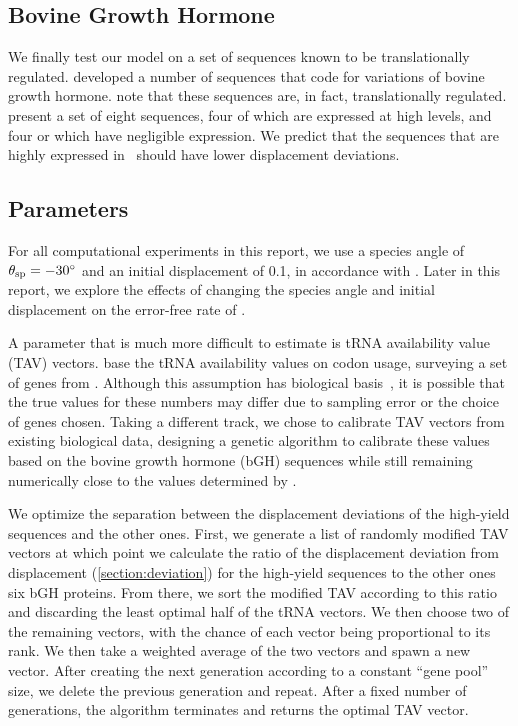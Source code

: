 \documentclass[12pt, draft]{article}
\numberwithin{equation}{section}
\begin{document}
\subsection{Bovine Growth Hormone}
We finally test our model on a set of sequences known to be translationally 
regulated.  \citet{schoner:bgh} developed a number of sequences that
code for variations of bovine growth hormone. \citeauthor{schoner:bgh}
note that these sequences are, in fact, translationally regulated.
\citeauthor{schoner:bgh} present a set of eight sequences, four of which
are expressed at high levels, and four or which have negligible expression.
We predict that the sequences that are highly expressed in
\ecoli\ should have lower displacement deviations.

\subsection{Parameters}
\label{section:parameters}
For all computational experiments in this report, we use a species
angle of $\theta_{\rm{sp}} = -30^\circ$ and an initial displacement of 0.1,
in accordance with \citet{lalit:embs}.  Later in this report, we explore
the effects of changing the species angle and initial displacement on the
error-free rate of \prfB.

A parameter that is much more difficult to estimate
is tRNA availability value (TAV) vectors.
\citeauthor{lalit:embs} base the tRNA availability values on codon usage, 
surveying a set of genes from \ecoli.
Although this assumption has biological basis~\cite{ikemura}, 
it is possible that the true values for these numbers may differ 
due to sampling error or the choice of genes chosen.
Taking a different track, we chose to calibrate TAV vectors from
existing biological data, designing a genetic algorithm to calibrate
these values based on the bovine growth hormone (bGH) sequences
while still remaining numerically close to the values determined by \citeauthor{lalit:embs}.

We optimize the separation between the displacement deviations of the 
high-yield sequences and the other ones.  
First, we generate a list of randomly modified TAV vectors at which
point we calculate the ratio of the displacement deviation from
displacement (\autoref{section:deviation}) for the high-yield sequences to the other ones
six bGH proteins. From there, we sort the modified TAV according to
this ratio and discarding the least optimal half of the tRNA
vectors. We then choose two of the remaining vectors, with the chance
of each vector being proportional to its rank.  We then take a
weighted average of the two vectors and spawn a new vector.  After
creating the next generation according to a constant ``gene pool''
size, we delete the previous generation and repeat. After a fixed
number of generations, the algorithm terminates and returns the
optimal TAV vector.
\end{document}
